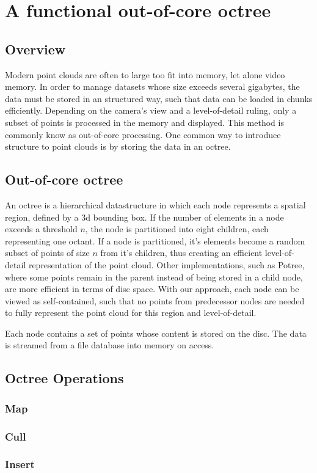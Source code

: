 \chapter{A functional out-of-core octree}
\section{Overview}
Modern point clouds are often to large too fit into memory, let alone video memory. In order to manage datasets whose size exceeds several gigabytes, the data must be stored in an structured way, such that data can be loaded in chunks efficiently. Depending on the camera's view and a level-of-detail ruling, only a subset of points is processed in the memory and displayed. This method is commonly know as out-of-core processing. One common way to introduce structure to point clouds is by storing the data in an octree. 


\section{Out-of-core octree}

An octree is a hierarchical datastructure in which each node represents a spatial region, defined by a 3d bounding box. If the number of elements in a node exceeds a threshold $n$, the node is partitioned into eight children, each representing one octant. If a node is partitioned, it's elements become a random subset of points of size $n$ from it's children, thus creating an efficient level-of-detail representation of the point cloud. 
Other implementations, such as Potree\cite{SCHUETZ-2016-POT}, where some points remain in the parent instead of being stored in a child node, are more efficient in terms of disc space. With our approach, each node can be viewed as self-contained, such that no points from predecessor nodes are needed to fully represent the point cloud for this region and level-of-detail.

Each node contains a set of points whose content is stored on the disc. The data is streamed from a file database into memory on access.


\section{Octree Operations}
	
\subsection{Map}
\subsection{Cull}
\subsection{Insert}


